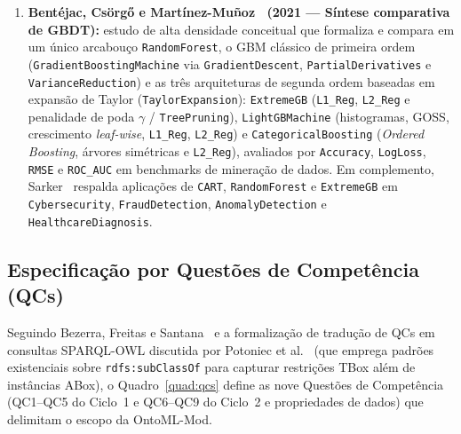 \documentclass[11pt,a4paper]{article}
\newcommand{\onto}[1]{\texttt{#1}}
\begin{document}
\begin{enumerate}[leftmargin=*,nosep]
  \item \textbf{Bentéjac, Csörgő e Martínez-Muñoz~\cite{bentejac2021comparative} (2021 --- Síntese comparativa de GBDT):} estudo de alta densidade conceitual que formaliza e compara em um único arcabouço \onto{RandomForest}, o GBM clássico de primeira ordem (\onto{GradientBoostingMachine} via \onto{GradientDescent}, \onto{PartialDerivatives} e \onto{VarianceReduction}) e as três arquiteturas de segunda ordem baseadas em expansão de Taylor (\onto{TaylorExpansion}): \onto{ExtremeGB} (\onto{L1\_Reg}, \onto{L2\_Reg} e penalidade de poda $\gamma$ / \onto{TreePruning}), \onto{LightGBMachine} (histogramas, GOSS, crescimento \emph{leaf-wise}, \onto{L1\_Reg}, \onto{L2\_Reg}) e \onto{CategoricalBoosting} (\emph{Ordered Boosting}, árvores simétricas e \onto{L2\_Reg}), avaliados por \onto{Accuracy}, \onto{LogLoss}, \onto{RMSE} e \onto{ROC\_AUC} em benchmarks de mineração de dados. Em complemento, Sarker~\cite{sarker2021ml} respalda aplicações de \onto{CART}, \onto{RandomForest} e \onto{ExtremeGB} em \onto{Cybersecurity}, \onto{FraudDetection}, \onto{AnomalyDetection} e \onto{HealthcareDiagnosis}.
\end{enumerate}

\subsection{Especificação por Questões de Competência (QCs)}

Seguindo Bezerra, Freitas e Santana~\cite{bezerra2013evaluating} e a formalização de tradução de QCs em consultas SPARQL-OWL discutida por Potoniec et al.~\cite{potoniec2020dataset} (que emprega padrões existenciais sobre \onto{rdfs:subClassOf} para capturar restrições TBox além de instâncias ABox), o Quadro~\ref{quad:qcs} define as nove Questões de Competência (QC1--QC5 do Ciclo~1 e QC6--QC9 do Ciclo~2 e propriedades de dados) que delimitam o escopo da OntoML-Mod.
\end{document}

